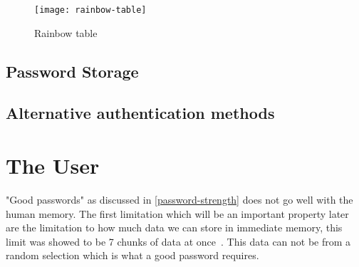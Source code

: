 \begin{figure}[h]
    \texttt{[image: rainbow-table]}
    \caption{Rainbow table}
    \label{rainbow-table}
\end{figure}

\subsection{Password Storage}\label{pw-storage}

\subsection{Alternative authentication methods}


\section{The User}\label{sec:the-user}
"Good passwords" as discussed in \ref{password-strength} does not go well with the human memory. The first limitation which will be an important property later are the limitation to how much data we can store in immediate memory, this limit was showed to be 7 chunks of data at once~\cite{magic-seven_miller}. This data can not be from a random selection which is what a good password requires.   





